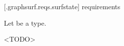 
 [\iotwod.graphsurf.reqs.surfstate]{ requirements}

\pnum
Let  be a \graphicssurfacestemplparam type.

\pnum
<TODO>

